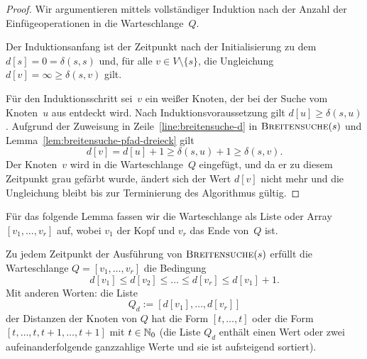 \begin{proof}
Wir argumentieren mittels vollständiger Induktion nach der Anzahl der Ein\-füge\-operatio\-nen in die Warteschlange~$Q$.

Der Induktionsanfang ist der Zeitpunkt nach der Initialisierung zu dem $d[s]=0=\delta(s,s)$ und, für alle $v \in V \setminus \{s\}$, die Ungleichung $d[v]=\infty\geq\delta(s,v)$ gilt.

Für den Induktionsschritt sei~$v$ ein weißer Knoten, der bei der Suche vom Knoten~$u$ aus entdeckt wird.
Nach Induktionsvoraussetzung gilt $d[u] \geq \delta(s,u)$.
Aufgrund der Zuweisung in Zeile~\ref{line:breitensuche-d} in $\mathop{\text{\textsc{Breitensuche}}}(s)$ und Lemma~\ref{lem:breitensuche-pfad-dreieck} gilt
\[
d[v] = d[u] + 1 \geq \delta(s,u) + 1 \geq \delta(s,v).
\]
Der Knoten~$v$ wird in die Warteschlange~$Q$ eingefügt, und da er zu diesem Zeitpunkt grau gefärbt wurde, ändert sich der Wert $d[v]$ nicht mehr und die Ungleichung bleibt bis zur Terminierung des Algorithmus gültig.
\end{proof}

\begin{bem} 
Für das folgende Lemma fassen wir die Warteschlange als Liste oder Array $[v_1,\ldots,v_r]$ auf, wobei $v_1$ der Kopf und $v_r$ das Ende von~$Q$ ist.
\end{bem} 

\begin{lem}
\label{lem:breitensuche-warteschlange-monotonie}
Zu jedem Zeitpunkt der Ausführung von $\mathop{\text{\textsc{Breitensuche}}}(s)$ erfüllt die Warteschlange $Q=[v_1,\ldots,v_r]$ die Bedingung
\[
d[v_1] \leq d[v_2] \leq \ldots \leq d[v_r] \leq d[v_1] + 1.
\]
Mit anderen Worten: die Liste 
\[
	Q_d:=[d[v_1],\ldots,d[v_r]]
\] der Distanzen der Knoten von $Q$ hat die Form $[t,\ldots,t]$ oder die Form $[t,\ldots,t,t+1,\ldots,t+1]$ mit $t \in \mathbb{N}_0$ (die Liste $Q_d$ enthält einen Wert oder zwei aufeinanderfolgende ganzzahlige Werte und sie ist aufsteigend sortiert). 
\end{lem}

